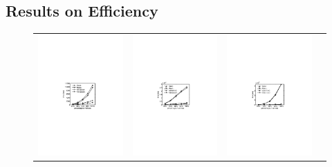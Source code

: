 \subsection{Results on Efficiency}
\label{efficiency}

\begin{figure}[htp]
\hspace*{-.4cm}
\centering
\begin{tabular}{c c c c}
  \begin{minipage}{3.76cm}
	\includegraphics[width=3.725cm]{figures/flickr-index}
  \end{minipage}
  &
  \begin{minipage}{3.76cm}
	\includegraphics[width=3.725cm]{figures/dblp-index}
  \end{minipage}
  &
  \begin{minipage}{3.76cm}
	\includegraphics[width=3.725cm]{figures/tencent-index}
  \end{minipage}
  &
  \begin{minipage}{3.76cm}

\end{minipage}
\end{tabular}
\end{figure}
